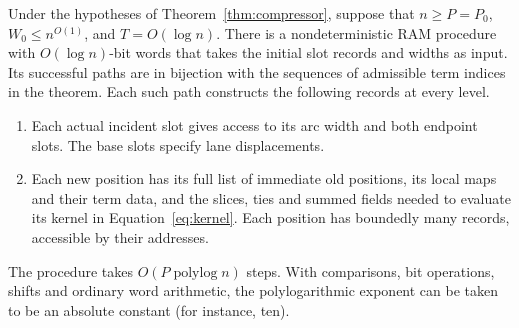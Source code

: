 \begin{lemma}\label{lem:descriptors}
Under the hypotheses of Theorem~\ref{thm:compressor}, suppose that
$n\ge P=P_0$, $W_0\le n^{O(1)}$, and $T=O(\log n)$. There is a
nondeterministic RAM procedure with $O(\log n)$-bit words that takes
the initial slot records and widths as input. Its successful paths are
in bijection with the sequences of admissible term indices in the
theorem. Each such path constructs the following records at every level.
\begin{enumerate}
\item Each actual incident slot gives access to its arc width and both
endpoint slots. The base slots specify lane displacements.
\item Each new position has its full list of immediate old positions,
its local maps and their term data, and the slices, ties and summed fields
needed to evaluate its kernel in Equation~\eqref{eq:kernel}. Each position
has boundedly many records, accessible by their addresses.
\end{enumerate}
The procedure takes $O(P\operatorname{polylog} n)$ steps. With
comparisons, bit operations, shifts and ordinary word arithmetic, the
polylogarithmic exponent can be taken to be an absolute constant
(for instance, ten).
\end{lemma}

